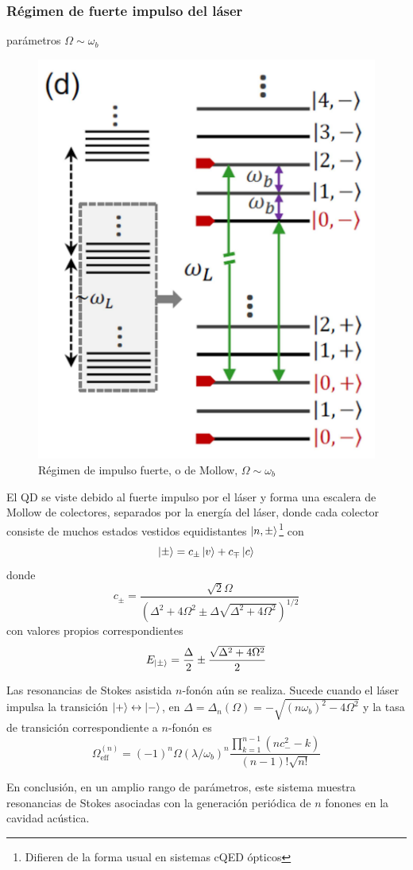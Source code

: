 \documentclass[../main.tex]{subfiles}
\begin{document}
\subsubsection{Régimen de fuerte impulso del láser}
parámetros $\Omega \sim \omega_b$
\begin{figure}[th]
	\centering
	\includegraphics[width=0.3\linewidth]{img/resonancesStokes3}
	\caption{Régimen de impulso fuerte, o de Mollow, $\Omega \sim \omega_b$ \parencite{Bin2020}}
	\label{fig:resonancesstokes3}
\end{figure}
El QD se viste debido al fuerte impulso por el láser y forma una escalera de Mollow de colectores, separados por la energía del láser, donde cada colector consiste de muchos estados vestidos equidistantes $\ket{n,\pm}$\footnote{Difieren de la forma usual en sistemas cQED ópticos} con
\begin{equation}
	\ket{\pm} = c_\pm \ket{v} + c_\mp \ket{c}
\end{equation}
donde 
\begin{equation}
	c_\pm = \frac{\sqrt{2} \Omega}{(\Delta^2+4\Omega^2 \pm \Delta\sqrt{\Delta^2+4\Omega^2})^{1/2}}
\end{equation}
con valores propios correspondientes
\begin{equation}
	E_{\ket{\pm}} = \frac{\Delta}{2} \pm \frac{\sqrt{\Delta^2+4\Omega^2}}{2}
\end{equation}

Las resonancias de Stokes asistida $n$-fonón aún se realiza. Sucede cuando el láser impulsa la transición $\ket{+} \leftrightarrow \ket{-}$, en $\Delta = \Delta_n(\Omega) = -\sqrt{(n\omega_b)^2-4\Omega^2}$ y la tasa de transición correspondiente a $n$-fonón es \parencite{Bin2020}
\begin{equation}\label{eq:effRabi3}
	\Omega_\text{eff}^{(n)} = (-1)^n \Omega (\lambda/\omega_b)^n \frac{\prod_{k=1}^{n-1}(nc_-^2-k)}{(n-1)!\sqrt{n!}}
\end{equation}

En conclusión, en un amplio rango de parámetros, este sistema muestra resonancias de Stokes asociadas con la generación periódica de $n$ fonones en la cavidad acústica.
\end{document}
